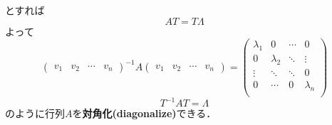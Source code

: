 とすれば
\begin{equation}
	AT = T \Lambda
\end{equation}
よって
\begin{equation}
 \left(
 \begin{array}{cccc}
  v_1 & v_2 & \cdots & v_n 
 \end{array}
 \right)^{-1} A
 \left(
 \begin{array}{cccc}
  v_1 & v_2 & \cdots & v_n 
 \end{array}
 \right) = 
 \left(
 \begin{array}{cccc}
  \lambda_1 & 0         & \cdots & 0 \\
   0        & \lambda_2 & \ddots & \vdots \\
   \vdots   & \ddots    & \ddots & 0\\
   0        & \cdots    &   0    & \lambda_n \\
 \end{array}
 \right)
\end{equation}
\begin{equation}
	T^{-1}AT =  \Lambda
\end{equation}
のように行列$A$を{\bf {対角化}(diagonalize)}できる．

